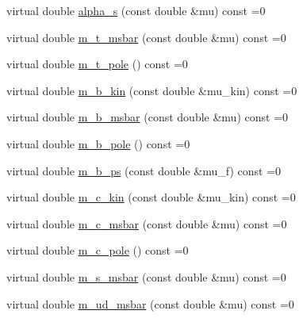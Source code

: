 \begin{DoxyCompactItemize}
\item 
virtual double \hyperlink{classeos_1_1ModelComponent_3_01components_1_1QCD_01_4_abf241eb181bace5db7f3ac6f303d2eec}{alpha\_\-s} (const double \&mu) const =0
\item 
virtual double \hyperlink{classeos_1_1ModelComponent_3_01components_1_1QCD_01_4_af57a3d70de7579dcf92aeacff6439a40}{m\_\-t\_\-msbar} (const double \&mu) const =0
\item 
virtual double \hyperlink{classeos_1_1ModelComponent_3_01components_1_1QCD_01_4_a0035735c19d0b3fced44b986b09410b7}{m\_\-t\_\-pole} () const =0
\item 
virtual double \hyperlink{classeos_1_1ModelComponent_3_01components_1_1QCD_01_4_ad8449029b487c614a769e1b0d6012e4c}{m\_\-b\_\-kin} (const double \&mu\_\-kin) const =0
\item 
virtual double \hyperlink{classeos_1_1ModelComponent_3_01components_1_1QCD_01_4_a1707fd6c3e6a4d8e02437652a3492f73}{m\_\-b\_\-msbar} (const double \&mu) const =0
\item 
virtual double \hyperlink{classeos_1_1ModelComponent_3_01components_1_1QCD_01_4_a372e8a7dced706f571b33bc18256e324}{m\_\-b\_\-pole} () const =0
\item 
virtual double \hyperlink{classeos_1_1ModelComponent_3_01components_1_1QCD_01_4_a654bbcce7c337f15ca6f2072da24463d}{m\_\-b\_\-ps} (const double \&mu\_\-f) const =0
\item 
virtual double \hyperlink{classeos_1_1ModelComponent_3_01components_1_1QCD_01_4_a0cd270cd7c6528f41a34cfc1e70bf056}{m\_\-c\_\-kin} (const double \&mu\_\-kin) const =0
\item 
virtual double \hyperlink{classeos_1_1ModelComponent_3_01components_1_1QCD_01_4_a82e6a460fe4fb848928fe6952fd56bb1}{m\_\-c\_\-msbar} (const double \&mu) const =0
\item 
virtual double \hyperlink{classeos_1_1ModelComponent_3_01components_1_1QCD_01_4_a3a2c090cf0f7099c471fd4cc413431e3}{m\_\-c\_\-pole} () const =0
\item 
virtual double \hyperlink{classeos_1_1ModelComponent_3_01components_1_1QCD_01_4_ac93d5c86dbb1e6118ab972e8c0f6bc12}{m\_\-s\_\-msbar} (const double \&mu) const =0
\item 
virtual double \hyperlink{classeos_1_1ModelComponent_3_01components_1_1QCD_01_4_a75172971f04fdac5927b0512cf77ebe2}{m\_\-ud\_\-msbar} (const double \&mu) const =0
\end{DoxyCompactItemize}


